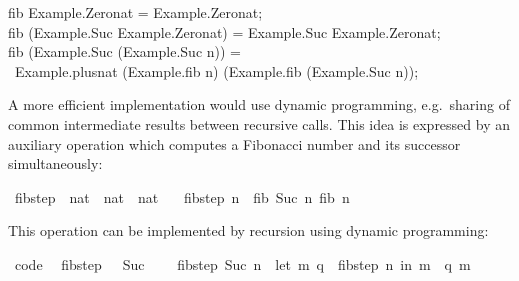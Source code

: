 \begin{isabellebody}
\begin{isamarkuptext}
\hspace*{0pt}fib Example.Zero{}nat = Example.Zero{}nat;\\
\hspace*{0pt}fib (Example.Suc Example.Zero{}nat) = Example.Suc Example.Zero{}nat;\\
\hspace*{0pt}fib (Example.Suc (Example.Suc n)) =\\
\hspace*{0pt} ~Example.plus{}nat (Example.fib n) (Example.fib (Example.Suc n));%
\end{isamarkuptext}%
\isamarkuptrue%
%
\endisatagquote
{\isafoldquote}%
%
\isadelimquote
%
\endisadelimquote
%
\begin{isamarkuptext}%
\noindent A more efficient implementation would use dynamic
  programming, e.g.~sharing of common intermediate results between
  recursive calls.  This idea is expressed by an auxiliary operation
  which computes a Fibonacci number and its successor simultaneously:%
\end{isamarkuptext}%
\isamarkuptrue%
%
\isadelimquote
%
\endisadelimquote
%
\isatagquote
{}\isamarkupfalse%
\ fib{\isacharunderscore}step\ {\isacharcolon}{\isacharcolon}\ {\isachardoublequoteopen}nat\ {\isasymRightarrow}\ nat\ {\isasymtimes}\ nat{\isachardoublequoteclose}\ \isanewline
\ \ {\isachardoublequoteopen}fib{\isacharunderscore}step\ n\ {\isacharequal}\ {\isacharparenleft}fib\ {\isacharparenleft}Suc\ n{\isacharparenright}{\isacharcomma}\ fib\ n{\isacharparenright}{\isachardoublequoteclose}%
\endisatagquote
{\isafoldquote}%
%
\isadelimquote
%
\endisadelimquote
%
\begin{isamarkuptext}%
\noindent This operation can be implemented by recursion using
  dynamic programming:%
\end{isamarkuptext}%
\isamarkuptrue%
%
\isadelimquote
%
\endisadelimquote
%
\isatagquote
{}\isamarkupfalse%
\ {\isacharbrackleft}code{\isacharbrackright}{\isacharcolon}\isanewline
\ \ {\isachardoublequoteopen}fib{\isacharunderscore}step\ {}\ {\isacharequal}\ {\isacharparenleft}Suc\ {}{\isacharcomma}\ {}{\isacharparenright}{\isachardoublequoteclose}\isanewline
\ \ {\isachardoublequoteopen}fib{\isacharunderscore}step\ {\isacharparenleft}Suc\ n{\isacharparenright}\ {\isacharequal}\ {\isacharparenleft}let\ {\isacharparenleft}m{\isacharcomma}\ q{\isacharparenright}\ {\isacharequal}\ fib{\isacharunderscore}step\ n\ in\ {\isacharparenleft}m\ {\isacharplus}\ q{\isacharcomma}\ m{\isacharparenright}{\isacharparenright}{\isachardoublequoteclose}\isanewline

\end{isabellebody}
